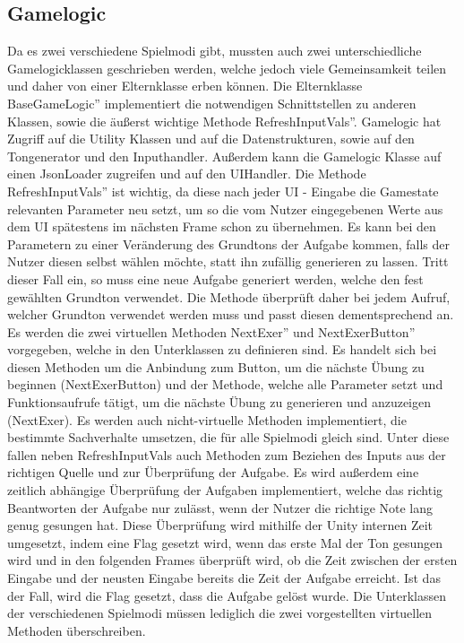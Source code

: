 \subsection*{Gamelogic}
Da es zwei verschiedene Spielmodi gibt, mussten auch zwei unterschiedliche Gamelogicklassen geschrieben werden, welche jedoch viele Gemeinsamkeit teilen und daher von einer Elternklasse erben können. Die Elternklasse \glqq BaseGameLogic'' implementiert die notwendigen Schnittstellen zu anderen Klassen, sowie die äußerst wichtige Methode \glqq RefreshInputVals''. Gamelogic hat Zugriff auf die Utility Klassen und auf die Datenstrukturen, sowie auf den Tongenerator und den Inputhandler. Außerdem kann die Gamelogic Klasse auf einen JsonLoader zugreifen und auf den UIHandler. Die Methode \glqq RefreshInputVals'' ist wichtig, da diese nach jeder UI - Eingabe die Gamestate relevanten Parameter neu setzt, um so die vom Nutzer eingegebenen Werte aus dem UI spätestens im nächsten Frame schon zu übernehmen. Es kann bei den Parametern zu einer Veränderung des Grundtons der Aufgabe kommen, falls der Nutzer diesen selbst wählen möchte, statt ihn zufällig generieren zu lassen. Tritt dieser Fall ein, so muss eine neue Aufgabe generiert werden, welche den fest gewählten Grundton verwendet. Die Methode überprüft daher bei jedem Aufruf, welcher Grundton verwendet werden muss und passt diesen dementsprechend an. Es werden die zwei virtuellen Methoden \glqq NextExer'' und \glqq NextExerButton'' vorgegeben, welche in den Unterklassen zu definieren sind. Es handelt sich bei diesen Methoden um die Anbindung zum Button, um die nächste Übung zu beginnen (NextExerButton) und der Methode, welche alle Parameter setzt und Funktionsaufrufe tätigt, um die nächste Übung zu generieren und anzuzeigen (NextExer). Es werden auch nicht-virtuelle Methoden implementiert, die bestimmte Sachverhalte umsetzen, die für alle Spielmodi gleich sind. Unter diese fallen neben RefreshInputVals auch Methoden zum Beziehen des Inputs aus der richtigen Quelle und zur Überprüfung der Aufgabe. Es wird außerdem eine zeitlich abhängige Überprüfung der Aufgaben implementiert, welche das richtig Beantworten der Aufgabe nur zulässt, wenn der Nutzer die richtige Note lang genug gesungen hat. Diese Überprüfung wird mithilfe der Unity internen Zeit umgesetzt, indem eine Flag gesetzt wird, wenn das erste Mal der Ton gesungen wird und in den folgenden Frames überprüft wird, ob die Zeit zwischen der ersten Eingabe und der neusten Eingabe bereits die Zeit der Aufgabe erreicht. Ist das der Fall, wird die Flag gesetzt, dass die Aufgabe gelöst wurde. Die Unterklassen der verschiedenen Spielmodi müssen lediglich die zwei vorgestellten virtuellen Methoden überschreiben.\\
